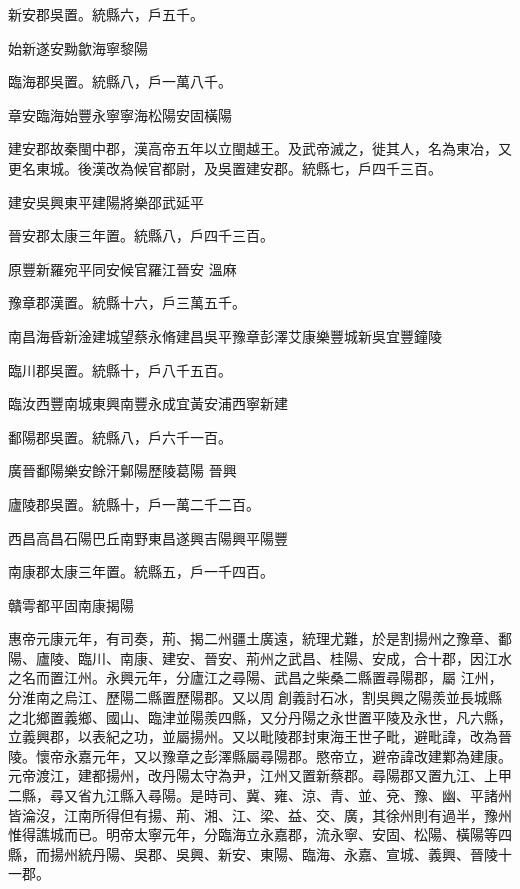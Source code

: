 \begin{pinyinscope}
 新安郡吳置。統縣六，戶五千。



 始新遂安黝歙海寧黎陽



 臨海郡吳置。統縣八，戶一萬八千。



 章安臨海始豐永寧寧海松陽安固橫陽



 建安郡故秦閩中郡，漢高帝五年以立閩越王。及武帝滅之，徙其人，名為東冶，又更名東城。後漢改為候官都尉，及吳置建安郡。統縣七，戶四千三百。



 建安吳興東平建陽將樂邵武延平



 晉安郡太康三年置。統縣八，戶四千三百。



 原豐新羅宛平同安候官羅江晉安
 溫麻



 豫章郡漢置。統縣十六，戶三萬五千。



 南昌海昏新淦建城望蔡永脩建昌吳平豫章彭澤艾康樂豐城新吳宜豐鐘陵



 臨川郡吳置。統縣十，戶八千五百。



 臨汝西豐南城東興南豐永成宜黃安浦西寧新建



 鄱陽郡吳置。統縣八，戶六千一百。



 廣晉鄱陽樂安餘汗鄡陽歷陵葛陽
 晉興



 廬陵郡吳置。統縣十，戶一萬二千二百。



 西昌高昌石陽巴丘南野東昌遂興吉陽興平陽豐



 南康郡太康三年置。統縣五，戶一千四百。



 贛雩都平固南康揭陽



 惠帝元康元年，有司奏，荊、揭二州疆土廣遠，統理尤難，於是割揚州之豫章、鄱陽、廬陵、臨川、南康、建安、晉安、荊州之武昌、桂陽、安成，合十郡，因江水之名而置江州。永興元年，分廬江之尋陽、武昌之柴桑二縣置尋陽郡，屬
 江州，分淮南之烏江、歷陽二縣置歷陽郡。又以周創義討石冰，割吳興之陽羨並長城縣之北鄉置義鄉、國山、臨津並陽羨四縣，又分丹陽之永世置平陵及永世，凡六縣，立義興郡，以表紀之功，並屬揚州。又以毗陵郡封東海王世子毗，避毗諱，改為晉陵。懷帝永嘉元年，又以豫章之彭澤縣屬尋陽郡。愍帝立，避帝諱改建鄴為建康。元帝渡江，建都揚州，改丹陽太守為尹，江州又置新蔡郡。尋陽郡又置九江、上甲二縣，尋又省九江縣入尋陽。是時司、冀、雍、涼、青、並、兗、豫、幽、平諸州皆淪沒，江南所得但有揚、荊、湘、江、梁、益、交、廣，其徐州則有過半，豫州
 惟得譙城而已。明帝太寧元年，分臨海立永嘉郡，流永寧、安固、松陽、橫陽等四縣，而揚州統丹陽、吳郡、吳興、新安、東陽、臨海、永嘉、宣城、義興、晉陵十一郡。




\end{pinyinscope}
